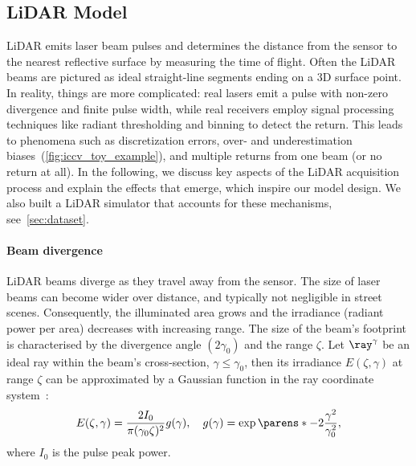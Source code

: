 \subsection{LiDAR Model}
\label{sec:lidar_model}

LiDAR emits laser beam pulses and determines the distance from the sensor to the nearest reflective surface by measuring the time of flight. 
Often the LiDAR beams are pictured as ideal straight-line segments ending on a 3D surface point. In reality, things are more complicated: real lasers emit a pulse with non-zero divergence and finite pulse width, while real receivers employ signal processing techniques like radiant thresholding and binning to detect the return. This leads to phenomena such as discretization errors, over- and underestimation biases~(\cf \cref{fig:iccv_toy_example}), and multiple returns from one beam (or no return at all). 
In the following, we discuss key aspects of the LiDAR acquisition process and explain the effects that emerge, which inspire our model design. We also built a LiDAR simulator that accounts for these mechanisms, see~\cref{sec:dataset}.


\paragraph{Beam divergence}
LiDAR beams diverge as they travel away from the sensor. The size of laser beams can become wider over distance, and typically not negligible in street scenes. Consequently, the illuminated area grows and the irradiance (radiant power per area) decreases with increasing range.
The size of the beam's footprint is characterised by the divergence angle $(2\gamma_0)$ and the range $\zeta$. Let $\ray^{\gamma}$ be an ideal ray within the beam's cross-section, $\gamma \leq \gamma_0$, then its irradiance $E(\zeta, \gamma)$ at range $\zeta$ can be approximated by a Gaussian function in the ray coordinate system~\cite{wagner2006gaussian}:
\begin{equation}
    E(\zeta, \gamma) =\frac{2I_0}{\pi (\gamma_0 \zeta)^2} g(\gamma), \quad g(\gamma) = \exp\parens*{-2 \frac{\gamma^2}{\gamma_0^2}},
\end{equation}
where $I_0$ is the pulse peak power. %


